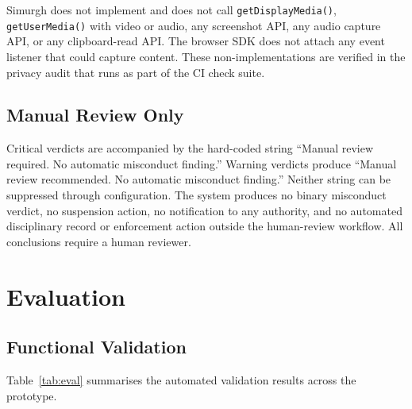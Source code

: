 \documentclass[conference]{IEEEtran}
\begin{document}
Simurgh does not implement and does not call \texttt{getDisplayMedia()}, \texttt{getUserMedia()} with video or audio, any screenshot API, any audio capture API, or any clipboard-read API. The browser SDK does not attach any event listener that could capture content. These non-implementations are verified in the privacy audit that runs as part of the CI check suite.

\subsection{Manual Review Only}

Critical verdicts are accompanied by the hard-coded string ``Manual review required. No automatic misconduct finding.'' Warning verdicts produce ``Manual review recommended. No automatic misconduct finding.'' Neither string can be suppressed through configuration. The system produces no binary misconduct verdict, no suspension action, no notification to any authority, and no automated disciplinary record or enforcement action outside the human-review workflow. All conclusions require a human reviewer.

\section{Evaluation}

\subsection{Functional Validation}

Table~\ref{tab:eval} summarises the automated validation results across the prototype.

\begin{table}[t]
\centering
\small
\caption{Automated Validation Summary}
\label{tab:eval}
\end{table}
\end{document}
